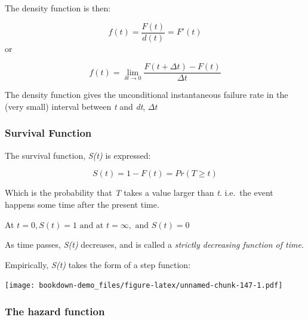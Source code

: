\documentclass[
]{article}
\newenvironment{Shaded}{\begin{snugshade}}{\end{snugshade}}
\newcommand{\AttributeTok}[1]{\textcolor[rgb]{0.77,0.63,0.00}{#1}}
\newcommand{\DecValTok}[1]{\textcolor[rgb]{0.00,0.00,0.81}{#1}}
\newcommand{\FunctionTok}[1]{\textcolor[rgb]{0.00,0.00,0.00}{#1}}
\newcommand{\NormalTok}[1]{#1}
\newcommand{\OtherTok}[1]{\textcolor[rgb]{0.56,0.35,0.01}{#1}}
\newcommand{\SpecialCharTok}[1]{\textcolor[rgb]{0.00,0.00,0.00}{#1}}
\newcommand{\StringTok}[1]{\textcolor[rgb]{0.31,0.60,0.02}{#1}}
\begin{document}
The density function is then:

\[ f(t) = \frac{F(t)}{d(t)} = F'(t)\]
or

\[ f(t) = \lim_{\delta t \rightarrow 0} \frac{F(t+\Delta t) - F(t)}{\Delta t}\]

The density function gives the unconditional instantaneous failure rate in the (very small) interval between \emph{t} and \emph{dt}, \(\Delta t\)

\hypertarget{survival-function}{%
\subsubsection{Survival Function}\label{survival-function}}

The survival function, \emph{S(t)} is expressed:

\[ S(t) = 1 - F(t) = Pr (T \geqslant t)\]

Which is the probability that \emph{T} takes a value larger than \emph{t}. i.e.~the event happens some time after the present time.

At \(t = 0, S(t) =1 \text { and at } t= \infty, \text { and } S(t) =0\)

As time passes, \emph{S(t)} decreases, and is called a \emph{strictly decreasing function of time}.

Empirically, \emph{S(t)} takes the form of a step function:

\begin{Shaded}
\end{Shaded}

\texttt{[image: bookdown-demo\_files/figure-latex/unnamed-chunk-147-1.pdf]}

\hypertarget{the-hazard-function}{%
\subsubsection{The hazard function}\label{the-hazard-function}}
\end{document}
